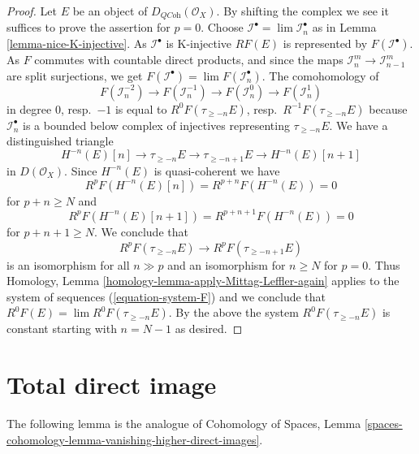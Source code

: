 \begin{proof}
Let $E$ be an object of $D_{\textit{QCoh}}(\mathcal{O}_X)$.
By shifting the complex we see it suffices to prove the assertion
for $p = 0$. Choose $\mathcal{I}^\bullet = \lim \mathcal{I}_n^\bullet$
as in Lemma \ref{lemma-nice-K-injective}.
As $\mathcal{I}^\bullet$ is K-injective $RF(E)$ is represented by
$F(\mathcal{I}^\bullet)$. As $F$ commutes with countable direct
products, and since the maps $\mathcal{I}_n^m \to \mathcal{I}_{n - 1}^m$
are split surjections, we get
$F(\mathcal{I}^\bullet) = \lim F(\mathcal{I}_n^\bullet)$.
The comohomology of
\begin{equation}
\label{equation-system-F}
F(\mathcal{I}_n^{-2}) \to
F(\mathcal{I}_n^{-1}) \to
F(\mathcal{I}_n^0) \to
F(\mathcal{I}_n^1)
\end{equation}
in degree $0$, resp.\ $-1$ is equal to $R^0F(\tau_{\geq -n}E)$,
resp.\ $R^{-1}F(\tau_{\geq -n}E)$ because $\mathcal{I}_n^\bullet$
is a bounded below complex of injectives representing $\tau_{\geq -n}E$.
We have a distinguished triangle
$$
H^{-n}(E)[n] \to \tau_{\geq -n}E \to \tau_{\geq - n + 1}E \to H^{-n}(E)[n + 1]
$$
in $D(\mathcal{O}_X)$. Since $H^{-n}(E)$ is quasi-coherent we have
$$
R^pF(H^{-n}(E)[n]) = R^{p + n}F(H^{-n}(E)) = 0
$$
for $p + n \geq N$ and
$$
R^pF(H^{-n}(E)[n + 1]) = R^{p + n + 1}F(H^{-n}(E)) = 0
$$
for $p + n + 1 \geq N$. We conclude that
$$
R^pF(\tau_{\geq -n}E) \to R^pF(\tau_{\geq - n + 1}E)
$$
is an isomorphism for all $n \gg p$ and an isomorphism for
$n \geq N$ for $p = 0$. Thus
Homology, Lemma \ref{homology-lemma-apply-Mittag-Leffler-again}
applies to the system of sequences (\ref{equation-system-F})
and we conclude that $R^0F(E) = \lim R^0F(\tau_{\geq - n}E)$.
By the above the system $R^0F(\tau_{\geq - n}E)$ is constant starting
with $n = N - 1$ as desired.
\end{proof}









\section{Total direct image}
\label{section-total-direct-image}

\noindent
The following lemma is the analogue of
Cohomology of Spaces, Lemma
\ref{spaces-cohomology-lemma-vanishing-higher-direct-images}.

